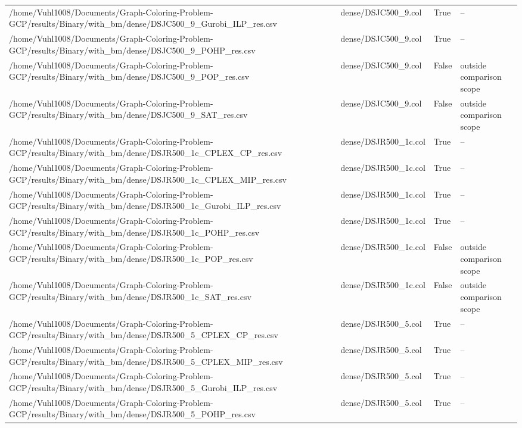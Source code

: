 \begin{table}[htbp]
\begin{tabular}{llll}
/home/Vuhl1008/Documents/Graph-Coloring-Problem-GCP/results/Binary/with\_bm/dense/DSJC500\_9\_Gurobi\_ILP\_res.csv & dense/DSJC500\_9.col & True & -- \\
/home/Vuhl1008/Documents/Graph-Coloring-Problem-GCP/results/Binary/with\_bm/dense/DSJC500\_9\_POHP\_res.csv & dense/DSJC500\_9.col & True & -- \\
/home/Vuhl1008/Documents/Graph-Coloring-Problem-GCP/results/Binary/with\_bm/dense/DSJC500\_9\_POP\_res.csv & dense/DSJC500\_9.col & False & outside comparison scope \\
/home/Vuhl1008/Documents/Graph-Coloring-Problem-GCP/results/Binary/with\_bm/dense/DSJC500\_9\_SAT\_res.csv & dense/DSJC500\_9.col & False & outside comparison scope \\
/home/Vuhl1008/Documents/Graph-Coloring-Problem-GCP/results/Binary/with\_bm/dense/DSJR500\_1c\_CPLEX\_CP\_res.csv & dense/DSJR500\_1c.col & True & -- \\
/home/Vuhl1008/Documents/Graph-Coloring-Problem-GCP/results/Binary/with\_bm/dense/DSJR500\_1c\_CPLEX\_MIP\_res.csv & dense/DSJR500\_1c.col & True & -- \\
/home/Vuhl1008/Documents/Graph-Coloring-Problem-GCP/results/Binary/with\_bm/dense/DSJR500\_1c\_Gurobi\_ILP\_res.csv & dense/DSJR500\_1c.col & True & -- \\
/home/Vuhl1008/Documents/Graph-Coloring-Problem-GCP/results/Binary/with\_bm/dense/DSJR500\_1c\_POHP\_res.csv & dense/DSJR500\_1c.col & True & -- \\
/home/Vuhl1008/Documents/Graph-Coloring-Problem-GCP/results/Binary/with\_bm/dense/DSJR500\_1c\_POP\_res.csv & dense/DSJR500\_1c.col & False & outside comparison scope \\
/home/Vuhl1008/Documents/Graph-Coloring-Problem-GCP/results/Binary/with\_bm/dense/DSJR500\_1c\_SAT\_res.csv & dense/DSJR500\_1c.col & False & outside comparison scope \\
/home/Vuhl1008/Documents/Graph-Coloring-Problem-GCP/results/Binary/with\_bm/dense/DSJR500\_5\_CPLEX\_CP\_res.csv & dense/DSJR500\_5.col & True & -- \\
/home/Vuhl1008/Documents/Graph-Coloring-Problem-GCP/results/Binary/with\_bm/dense/DSJR500\_5\_CPLEX\_MIP\_res.csv & dense/DSJR500\_5.col & True & -- \\
/home/Vuhl1008/Documents/Graph-Coloring-Problem-GCP/results/Binary/with\_bm/dense/DSJR500\_5\_Gurobi\_ILP\_res.csv & dense/DSJR500\_5.col & True & -- \\
/home/Vuhl1008/Documents/Graph-Coloring-Problem-GCP/results/Binary/with\_bm/dense/DSJR500\_5\_POHP\_res.csv & dense/DSJR500\_5.col & True & -- \\

\end{tabular}
\end{table}
